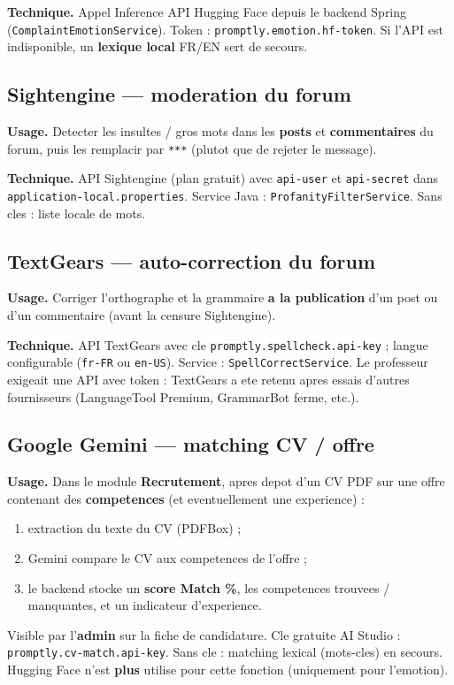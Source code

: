 \textbf{Technique.} Appel Inference API Hugging Face depuis le backend Spring
(\texttt{ComplaintEmotionService}). Token :
\texttt{promptly.emotion.hf-token}. Si l'API est indisponible, un
\textbf{lexique local} FR/EN sert de secours.

\subsection{Sightengine --- moderation du forum}

\textbf{Usage.} Detecter les insultes / gros mots dans les \textbf{posts} et
\textbf{commentaires} du forum, puis les remplacir par \texttt{***} (plutot
que de rejeter le message).

\textbf{Technique.} API Sightengine (plan gratuit) avec \texttt{api-user} et
\texttt{api-secret} dans \texttt{application-local.properties}. Service Java :
\texttt{ProfanityFilterService}. Sans cles : liste locale de mots.

\subsection{TextGears --- auto-correction du forum}

\textbf{Usage.} Corriger l'orthographe et la grammaire \textbf{a la
publication} d'un post ou d'un commentaire (avant la censure Sightengine).

\textbf{Technique.} API TextGears avec cle
\texttt{promptly.spellcheck.api-key} ; langue configurable
(\texttt{fr-FR} ou \texttt{en-US}). Service : \texttt{SpellCorrectService}.
Le professeur exigeait une API avec token : TextGears a ete retenu apres
essais d'autres fournisseurs (LanguageTool Premium, GrammarBot ferme, etc.).

\subsection{Google Gemini --- matching CV / offre}

\textbf{Usage.} Dans le module \textbf{Recrutement}, apres depot d'un CV PDF
sur une offre contenant des \textbf{competences} (et eventuellement une
experience) :
\begin{enumerate}
  \item extraction du texte du CV (PDFBox) ;
  \item Gemini compare le CV aux competences de l'offre ;
  \item le backend stocke un \textbf{score Match \%}, les competences
        trouvees / manquantes, et un indicateur d'experience.
\end{enumerate}
Visible par l'\textbf{admin} sur la fiche de candidature. Cle gratuite AI Studio :
\texttt{promptly.cv-match.api-key}. Sans cle : matching lexical (mots-cles)
en secours. Hugging Face n'est \textbf{plus} utilise pour cette fonction
(uniquement pour l'emotion).

